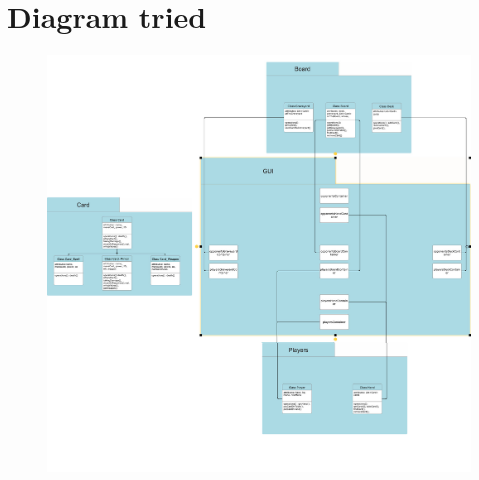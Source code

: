 \documentclass[12pt]{article}
\begin{document}
\section{Diagram tried}
\begin{figure}[h]
\centering 
\includegraphics[width=1\textwidth]{img/Diagram.jpg}
\end{figure}

\newpage
\end{document}
